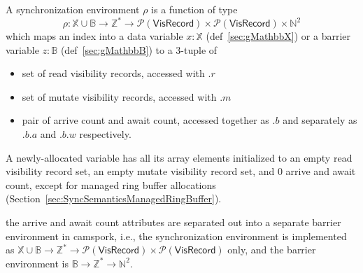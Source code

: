 

A synchronization environment $\rho$ is a function of type
\begin{equation*}
    \rho: \mathbb{X} \cup \mathbb{B} \to \mathbb{Z}^* \to \mathcal{P}(\mathsf{VisRecord}) \times \mathcal{P}(\mathsf{VisRecord}) \times \mathbb{N}^2
\end{equation*}
which maps an index into a data variable $x: \mathbb{X}$ (def~\ref{sec:gMathbbX}) or a barrier variable $z: \mathbb{B}$ (def~\ref{sec:gMathbbB}) to a 3-tuple of
\begin{itemize}
  \item set of read visibility records, accessed with $.r$
  \item set of mutate visibility records, accessed with $.m$
  \item pair of arrive count and await count, accessed together as $.b$ and separately as $.b.a$ and $.b.w$ respectively.
\end{itemize}

A newly-allocated variable has all its array elements initialized to an empty read visibility record set, an empty mutate visibility record set, and 0 arrive and await count, except for managed ring buffer allocations (Section~\ref{sec:SyncSemanticsManagedRingBuffer}).

 the arrive and await count attributes are separated out into a separate barrier environment in camspork, i.e., the synchronization environment is implemented as $\mathbb{X} \cup \mathbb{B} \to \mathbb{Z}^* \to \mathcal{P}(\mathsf{VisRecord}) \times \mathcal{P}(\mathsf{VisRecord})$ only, and the barrier environment is $\mathbb{B} \to \mathbb{Z}^* \to \mathbb{N}^2$.


